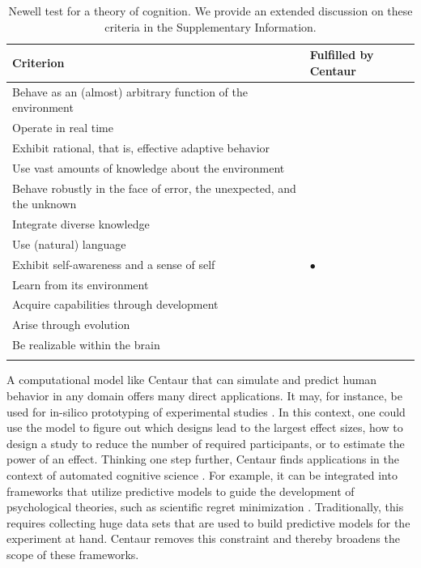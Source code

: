 \documentclass[pdflatex,sn-nature]{sn-jnl}%
\newcommand{\cmark}{\ding{51}}%
\newcommand{\xmark}{\ding{55}}%
\theoremstyle{thmstyleone}%
\theoremstyle{thmstyletwo}%
\theoremstyle{thmstylethree}%
\begin{document}
\begin{table}[]
    \centering
    \begin{tabular}{@{}L{9.7cm}R{3cm}@{}}
        \toprule
         \textbf{Criterion} & \textbf{Fulfilled by Centaur} \\
         \midrule 
         Behave as an (almost) arbitrary function of the environment & {\color{ForestGreen}\cmark} \\
         Operate in real time & {\color{ForestGreen}\cmark} \\
         Exhibit rational, that is, effective adaptive behavior & {\color{ForestGreen}\cmark} \\
         Use vast amounts of knowledge about the environment &  {\color{ForestGreen}\cmark} \\
         Behave robustly in the face of error, the unexpected, and the unknown &  {\color{ForestGreen}\cmark} \\
         Integrate diverse knowledge & {\color{ForestGreen}\cmark} \\
         Use (natural) language &  {\color{ForestGreen}\cmark} \\
         Exhibit self-awareness and a sense of self & {\color{gray}$\bullet$} \\  
         Learn from its environment & {\color{ForestGreen}\cmark} \\
         Acquire capabilities through development & {\color{BrickRed}\xmark} \\
         Arise through evolution &  {\color{BrickRed}\xmark} \\
         Be realizable within the brain & {\color{ForestGreen}\cmark} \\
         \bottomrule \\
    \end{tabular}
    \caption{Newell test for a theory of cognition. We provide an extended discussion on these criteria in the Supplementary Information.}
    \label{tab:tab1}
\end{table}

A computational model like Centaur that can simulate and predict human behavior in any domain offers many direct applications. It may, for instance, be used for in-silico prototyping of experimental studies \cite{dillion2023can}. In this context, one could use the model to figure out which designs lead to the largest effect sizes, how to design a study to reduce the number of required participants, or to estimate the power of an effect. Thinking one step further, Centaur finds applications in the context of automated cognitive science \cite{musslick2024automatingpracticescience, musslick2024closed}. For example, it can be integrated into frameworks that utilize predictive models to guide the development of psychological theories, such as scientific regret minimization \cite{agrawal2020scaling}. Traditionally, this requires collecting huge data sets that are used to build predictive models for the experiment at hand. Centaur removes this constraint and thereby broadens the scope of these frameworks.
\end{document}

